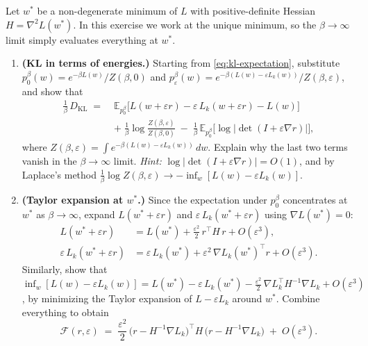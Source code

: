 \documentclass[11pt]{article}
\newcommand{\E}{\mathbb{E}}
\begin{document}
\begin{exercise}\label{ex:bif-ot}
Let $w^*$ be a non-degenerate minimum of $L$ with positive-definite Hessian $H = \nabla^2 L(w^*)$. In this exercise we work at the unique minimum, so the $\beta\to\infty$ limit simply evaluates everything at $w^*$.
\begin{enumerate}
  \item \textbf{(KL in terms of energies.)} Starting from \eqref{eq:kl-expectation}, substitute $p_0^\beta(w) = e^{-\beta L(w)}/Z(\beta,0)$ and $p_\varepsilon^\beta(w) = e^{-\beta(L(w)-\varepsilon L_k(w))}/Z(\beta,\varepsilon)$, and show that
  \begin{align*}
    \frac{1}{\beta}\,D_{\mathrm{KL}} \;=\; &\E_{p_0^\beta}\!\bigl[L(w + \varepsilon r) - \varepsilon\,L_k(w + \varepsilon r) - L(w)\bigr] \\
    &+\; \frac{1}{\beta}\log\frac{Z(\beta,\varepsilon)}{Z(\beta,0)} \;-\; \frac{1}{\beta}\,\E_{p_0^\beta}\!\bigl[\log|\det(I + \varepsilon\nabla r)|\bigr],
  \end{align*}
  where $Z(\beta,\varepsilon) = \int e^{-\beta(L(w)-\varepsilon L_k(w))}\,dw$. Explain why the last two terms vanish in the $\beta\to\infty$ limit. \emph{Hint:} $\log|\det(I+\varepsilon\nabla r)| = O(1)$, and by Laplace's method $\tfrac{1}{\beta}\log Z(\beta,\varepsilon) \to -\inf_w[L(w) - \varepsilon L_k(w)]$.

  \item \textbf{(Taylor expansion at $w^*$.)} Since the expectation under $p_0^\beta$ concentrates at $w^*$ as $\beta\to\infty$, expand $L(w^* + \varepsilon r)$ and $\varepsilon\,L_k(w^* + \varepsilon r)$ using $\nabla L(w^*) = 0$:
  \begin{align*}
    L(w^* + \varepsilon r) &= L(w^*) + \tfrac{\varepsilon^2}{2}\,r^\top H\,r + O(\varepsilon^3), \\
    \varepsilon\,L_k(w^* + \varepsilon r) &= \varepsilon\,L_k(w^*) + \varepsilon^2\,\nabla L_k(w^*)^\top r + O(\varepsilon^3).
  \end{align*}
  Similarly, show that $\inf_w[L(w) - \varepsilon L_k(w)] = L(w^*) - \varepsilon\,L_k(w^*) - \tfrac{\varepsilon^2}{2}\,\nabla L_k^\top H^{-1}\nabla L_k + O(\varepsilon^3)$, by minimizing the Taylor expansion of $L - \varepsilon L_k$ around $w^*$. Combine everything to obtain
  \begin{equation}\label{eq:ot-quadratic}
    \mathcal{F}(r,\varepsilon) \;=\; \frac{\varepsilon^2}{2}\,\bigl(r - H^{-1}\nabla L_k\bigr)^\top H\,\bigl(r - H^{-1}\nabla L_k\bigr) \;+\; O(\varepsilon^3).
  \end{equation}


\end{enumerate}
\end{exercise}
\end{document}
